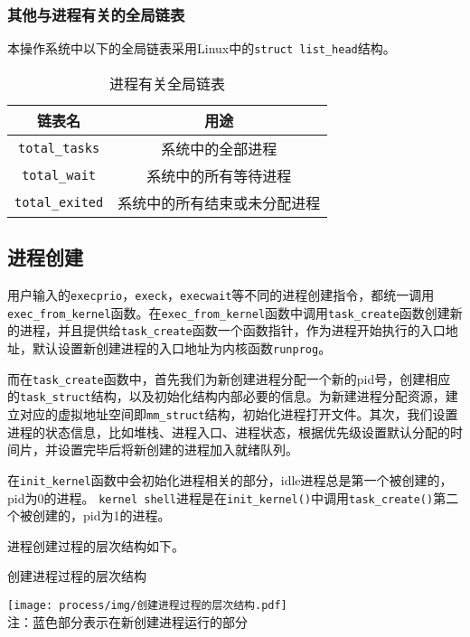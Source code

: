 \subsubsection{其他与进程有关的全局链表}

本操作系统中以下的全局链表采用Linux中的\texttt{struct list\_head}结构。



\begin{table}[H]
  \centering
  \caption{进程有关全局链表}
  \begin{tabular}{|c|c|}
  \hline
  链表名 & 用途 \\
  \hline
  \texttt{total\_tasks}  & 系统中的全部进程 \\
  \hline
  \texttt{total\_wait}   & 系统中的所有等待进程 \\
  \hline
  \texttt{total\_exited} & 系统中的所有结束或未分配进程 \\
  \hline
  \end{tabular}
\end{table}


\subsection{进程创建}

用户输入的\texttt{execprio}，\texttt{execk}，\texttt{execwait}等不同的进程创建指令，都统一调用\texttt{exec\_from\_kernel}函数。在\texttt{exec\_from\_kernel}函数中调用\texttt{task\_create}函数创建新的进程，并且提供给\texttt{task\_create}函数一个函数指针，作为进程开始执行的入口地址，默认设置新创建进程的入口地址为内核函数\texttt{runprog}。

而在\texttt{task\_create}函数中，首先我们为新创建进程分配一个新的pid号，创建相应的\texttt{task\_struct}结构，以及初始化结构内部必要的信息。为新建进程分配资源，建立对应的虚拟地址空间即\texttt{mm\_struct}结构，初始化进程打开文件。其次，我们设置进程的状态信息，比如堆栈、进程入口、进程状态，根据优先级设置默认分配的时间片，并设置完毕后将新创建的进程加入就绪队列。

在\texttt{init\_kernel}函数中会初始化进程相关的部分，idle进程总是第一个被创建的，pid为0的进程。
\texttt{kernel shell}进程是在\texttt{init\_kernel()}中调用\texttt{task\_create()}第二个被创建的，pid为1的进程。

进程创建过程的层次结构如下。

\begin{table}[H]
  \centering
  \caption{创建进程过程的层次结构}
  \texttt{[image: process/img/创建进程过程的层次结构.pdf]}\\
  {注：蓝色部分表示在新创建进程运行的部分}
\end{table}

